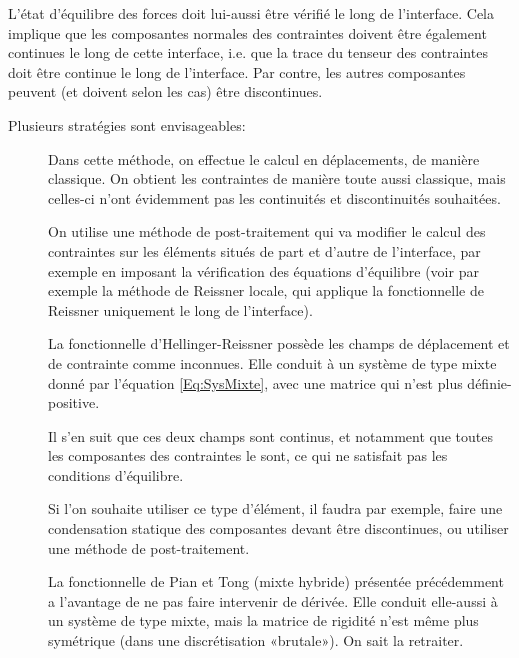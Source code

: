 \medskip
L'état d'équilibre des forces doit lui-aussi être vérifié le long de l'interface. Cela implique que les composantes normales des contraintes doivent être également continues le long de cette interface, i.e. que la trace du tenseur des contraintes doit être continue le long de l'interface. Par contre, les autres composantes peuvent (et doivent selon les cas) être discontinues.

\medskip
Plusieurs stratégies sont envisageables:
\begin{description}
\item[]

	Dans cette méthode, on effectue le calcul en déplacements, de manière classique. On obtient les contraintes de manière toute aussi classique, mais celles-ci 	n'ont évidemment pas les continuités et discontinuités souhaitées.

	On utilise une méthode de post-traitement qui va modifier le calcul des contraintes 	sur les éléments situés de part et d'autre de l'interface, par exemple 	en imposant la vérification des équations d'équilibre (voir par exemple 	la méthode de Reissner locale, qui applique la fonctionnelle de Reissner uniquement 	le long de l'interface).\item[]

	La fonctionnelle d'Hellinger-Reissner possède les champs de déplacement et de 	contrainte comme inconnues. Elle conduit à un système de type mixte donné par l'équation \eqref{Eq:SysMixte}, avec une matrice qui n'est plus définie-positive.

	Il s'en suit que ces deux champs sont continus, et notamment que toutes les 	composantes des contraintes le sont, ce qui ne satisfait pas les conditions d'équilibre.

	Si l'on souhaite utiliser ce type d'élément, il faudra par exemple, faire une condensation statique des composantes devant être discontinues, ou utiliser une méthode de post-traitement.

	\item[]

	La fonctionnelle de Pian et Tong (mixte hybride) présentée précédemment a l'avantage de ne pas faire intervenir de dérivée. Elle conduit elle-aussi à un système de type mixte, mais la matrice de rigidité n'est même plus symétrique (dans une discrétisation «brutale»). On sait la retraiter.


\end{description}

